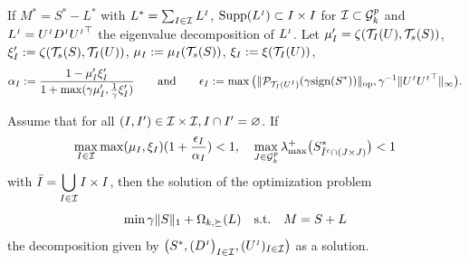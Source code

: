 \documentclass[letterpaper]{article}
\begin{document}
\begin{theorem}
\label{theo:two}
If $M^*=S^*-L^*$ with $L^*=\sum_{I \in \mathcal{I}} L^{{\scriptscriptstyle I}}$, ${\rm Supp}(L^{{\scriptscriptstyle I}}) \subset I \times I$ for $\mathcal{I} \subset \mathcal{G}^p_k$ %
and $L^{{\scriptscriptstyle I}}=U^{{\scriptscriptstyle I}} D^{{\scriptscriptstyle I}} {U^{{\scriptscriptstyle I}}}^\top$ the eigenvalue decomposition of $L^{{\scriptscriptstyle I}}$.
Let $\mu'_I=\zeta(\mathcal{T}_I(U),\mathcal{T}_s(S))$, $\xi'_I :=\zeta(\mathcal{T}_s(S),\mathcal{T}_I(U))$, $\mu_I:=\mu_I(\mathcal{T}_s(S))$, $\xi_I:=\xi(\mathcal{T}_I(U))$, 
$$\alpha_I:=\frac{1-\mu'_I\xi'_I}{1+\max(\gamma \mu'_I,\frac{1}{\gamma} \xi'_I)} \qquad \text{and} \qquad \epsilon_I :=\max \big (\|\mathcal{P}_{\mathcal{T}_I(U^{{\scriptscriptstyle I}})}(\gamma \text{sign}(S^*))\|_{{\rm op}}, \gamma^{-1}\|U^{{\scriptscriptstyle I}} {U^{{\scriptscriptstyle I}}}^\top\|_{\infty} \big ).$$

Assume that for all $(I,I') \in \mathcal{I} \times \mathcal{I}, I \cap I'=\varnothing$. If $$\displaystyle\max_{I \in \mathcal{I}} \max(\mu_I,\xi_I) (1+\frac{\epsilon_I}{\alpha_I})<1, \quad \displaystyle \max_{J \in \mathcal{G}^p_k} \lambda_{\max}^+\big (S^*_{\bar{I}^c \cap (J \times J)} \big ) <1$$ %
with $\displaystyle \bar{I}=\bigcup_{I \in \mathcal{I}} I \times I$,
then the solution of the optimization problem $$\displaystyle \min \gamma \|S\|_1+\Omega_{k,\succeq}(L) \quad \text{\text{s.t.}} \quad M=S+L$$
 the decomposition given by $\big (S^*,(D^{{\scriptscriptstyle I}} \big)_{I \in \mathcal{I}},(U^{{\scriptscriptstyle I}})_{I \in \mathcal{I}} \big )$ as a solution.
\end{theorem}
\end{document}
